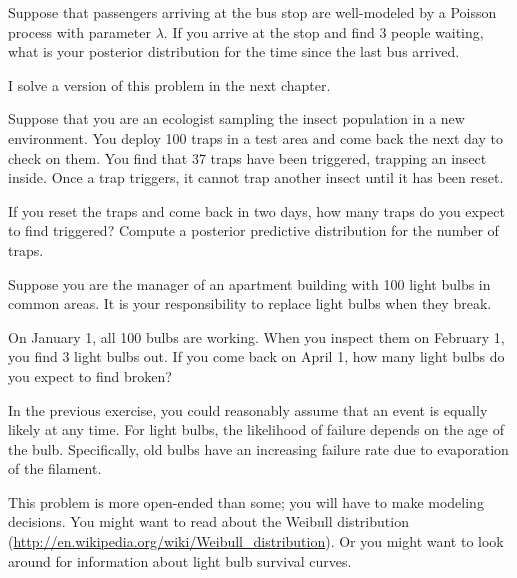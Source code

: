 \documentclass[12pt]{book}
\begin{document}
\begin{exercise}

Suppose that passengers arriving at the bus stop are well-modeled
by a Poisson process with parameter $\lambda$.  If you arrive at the
stop and find 3 people waiting, what is your posterior distribution
for the time since the last bus arrived.

I solve a version of this problem in the next chapter.

\end{exercise}


\begin{exercise}

Suppose that you are an ecologist sampling the insect population in
a new environment.  You deploy 100 traps in a test area and come back
the next day to check on them.  You find that 37 traps have been
triggered, trapping an insect inside.  Once a trap triggers, it
cannot trap another insect until it has been reset.

If you reset the traps and come back in two days, how many traps
do you expect to find triggered?  Compute a posterior predictive
distribution for the number of traps.

\end{exercise}


\begin{exercise}

Suppose you are the manager of an apartment building with
100 light bulbs in common areas.  It is your responsibility
to replace light bulbs when they break.

On January 1, all 100 bulbs are working.  When you inspect
them on February 1, you find 3 light bulbs out.  If you
come back on April 1, how many light bulbs do you expect to
find broken?

In the previous exercise, you could reasonably assume that an event is
equally likely at any time.  For light bulbs, the likelihood of
failure depends on the age of the bulb.  Specifically, old bulbs
have an increasing failure rate due to evaporation of the filament.

This problem is more open-ended than some; you will have to make
modeling decisions.  You might want to read about the Weibull
distribution
(\url{http://en.wikipedia.org/wiki/Weibull_distribution}).
Or you might want to look around for information about
light bulb survival curves.

\end{exercise}
\end{document}
